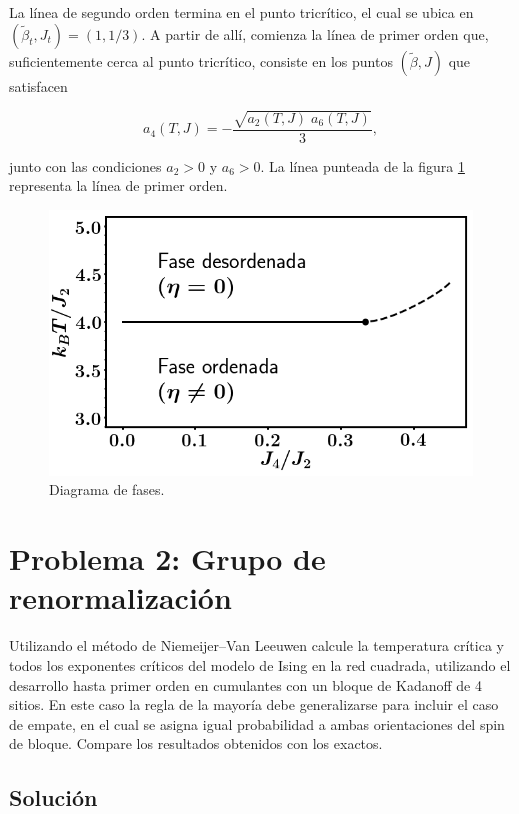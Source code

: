 \documentclass[10pt]{article}
\begin{document}
La l\'inea de segundo orden termina en el punto tricr\'itico, el cual se ubica en $(\tilde{\beta}_t, J_t)=(1, 1/3)$. A partir de all\'i, comienza la l\'inea de primer orden que, suficientemente cerca al punto tricr\'itico, consiste en los puntos $(\tilde{\beta}, J)$ que satisfacen 

\begin{equation}
a_4(T, J)=-\dfrac{\sqrt{a_2(T,J)\;a_6(T,J)}}{3},
\end{equation}

junto con las condiciones $a_2>0$ y $a_6>0$. La l\'inea punteada de la figura \ref{fig:fases} representa la l\'inea de primer orden.

\begin{figure}
\centering
\includegraphics[scale=0.5]{phase_diagram.png}
\caption{\label{fig:fases} Diagrama de fases.}
\end{figure}

\pagebreak

\section*{Problema 2: Grupo de renormalizaci\'on}

Utilizando el m\'etodo de Niemeijer--Van Leeuwen calcule la temperatura cr\'itica y todos los exponentes cr\'iticos del modelo de Ising en la red cuadrada, utilizando el desarrollo hasta primer orden en cumulantes con un bloque de Kadanoff de 4 sitios. En este caso la regla de la mayor\'ia debe generalizarse para incluir el caso de empate, en el cual se asigna igual probabilidad a ambas orientaciones del spin de bloque. Compare los resultados obtenidos con los exactos.

\subsection*{Soluci\'on}
\end{document}
